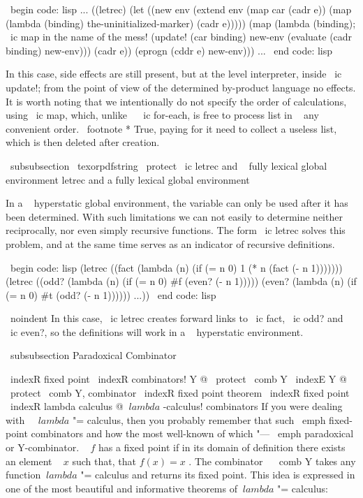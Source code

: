 {\ begin {code: lisp}
...
((letrec)
 (let ((new env (extend env
                        (map car (cadr e))
                        (map (lambda (binding) the-uninitialized-marker)
                             (cadr e)))))
      (map (lambda (binding); \ ic {map} in the name of the mess!
             (update! (car binding)
                      new-env
                      (evaluate (cadr binding) new-env)))
           (cadr e))
      (eprogn (cddr e) new-env))) ...
\ end {code: lisp}

In this case, side effects are still present, but at the level
interpreter, inside \ ic {update!}; from the point of view of the determined by-product language
no effects. It is worth noting that we intentionally do not specify the order of calculations,
using \ ic {map}, which, unlike ~ \ ic {for-each}, is free to process
list in ~ any convenient order. \ footnote * {True, paying for it
need to collect a useless list, which is then deleted after
creation.}


\ subsubsection { \ texorpdfstring %
{ \ protect \ ic {letrec} and ~ fully lexical global environment} %
{letrec and a fully lexical global environment}}

In a ~ hyperstatic global environment, the variable can only be used
after it has been determined. With such limitations we can not easily
to determine neither reciprocally, nor even simply recursive functions. The form \ ic {letrec}
solves this problem, and at the same time serves as an indicator of recursive definitions.

\ begin {code: lisp}
(letrec ((fact (lambda (n)
                 (if (= n 0) 1 (* n (fact (- n 1)))))))
  (letrec ((odd? (lambda (n) (if (= n 0) #f (even? (- n 1)))))
           (even? (lambda (n) (if (= n 0) #t (odd? (- n 1))))))
    ...))
\ end {code: lisp}

\ noindent
In this case, \ ic {letrec} creates forward links to \ ic {fact}, \ ic {odd?}
and ~ \ ic {even?}, so the definitions will work in a ~ hyperstatic environment.


\ subsubsection {Paradoxical Combinator}

\ indexR {fixed point}
\ indexR {combinators! Y @ \ protect \ comb {Y}}
\ indexE {Y @ \ protect \ comb {Y}, combinator}
\ indexR {fixed point theorem}
\ indexR {fixed point}
\ indexR {lambda calculus @ $ \ lambda $ -calculus! combinators}
If you were dealing with ~ $ \ lambda $ "= calculus, then you probably remember that
such \ emph {fixed-point combinators} and how the most well-known
of which "--- \ emph {paradoxical} or Y-combinator. ~ $ f $ has
a fixed point if in its domain of definition there exists an element ~ $ x $ such that,
that $ f (x) = x $ . The combinator ~ \ comb {Y} takes any function
$ \ lambda $ "= calculus and returns its fixed point. This idea is expressed
in one of the most beautiful and informative theorems of $ \ lambda $ "= calculus:

}

